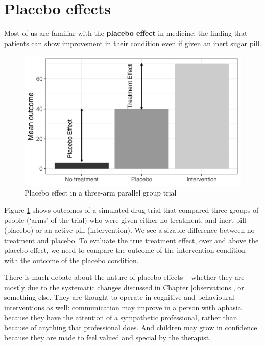 \documentclass{krantz}
\begin{document}
\hypertarget{placebo-effects}{%
\section{Placebo effects}\label{placebo-effects}}

Most of us are familiar with the \textbf{placebo effect} in medicine: the finding that patients can show improvement in their condition even if given an inert sugar pill.

\begin{figure}
\includegraphics[width=0.75\linewidth]{images_bw/placebotab} \caption{Placebo effect in a three-arm parallel group trial}\label{fig:placebotab}
\end{figure}

Figure \ref{fig:placebotab} shows outcomes of a simulated drug trial that compared three groups of people (`arms' of the trial) who were given either no treatment, and inert pill (placebo) or an active pill (intervention). We see a sizable difference between no treatment and placebo. To evaluate the true treatment effect, over and above the placebo effect, we need to compare the outcome of the intervention condition with the outcome of the placebo condition.

There is much debate about the nature of placebo effects -- whether they are mostly due to the systematic changes discussed in Chapter \ref{observations}, or something else. They are thought to operate in cognitive and behavioural interventions as well: communication may improve in a person with aphasia because they have the attention of a sympathetic professional, rather than because of anything that professional does. And children may grow in confidence because they are made to feel valued and special by the therapist.
\end{document}
